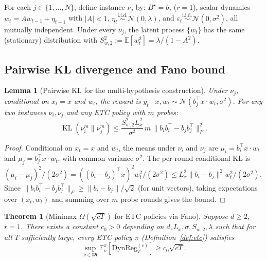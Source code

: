 \documentclass[12pt]{article}
\newcommand{\E}{\mathbb{E}}
\newcommand{\DynReg}{\mathrm{DynReg}}
\DeclareMathOperator{\KL}{KL}
\newtheorem{lemma}{Lemma}
\newtheorem{theorem}{Theorem}
\theoremstyle{plain}
\theoremstyle{definition}
\begin{document}
For each $j \in \{1, \ldots, N\}$, define instance $\nu_j$ by: $B^\star = b_j$ ($r = 1$), scalar dynamics $w_t = A w_{t-1} + \eta_{t-1}$ with $|A| < 1$, $\eta_t \stackrel{\mathrm{i.i.d.}}{\sim} \mathcal{N}(0, \lambda)$, and $\varepsilon_t \stackrel{\mathrm{i.i.d.}}{\sim} \mathcal{N}(0, \sigma^2)$, all mutually independent. Under every $\nu_j$, the latent process $\{w_t\}$ has the same (stationary) distribution with $S_{w,2}^2 := \E[w_t^2] = \lambda/(1 - A^2)$.

\subsection{Pairwise KL divergence and Fano bound}

\begin{lemma}[Pairwise KL for the multi-hypothesis construction]
\label{lem:kl_fano}
Under $\nu_j$, conditional on $x_t = x$ and $w_t$, the reward is $y_t \mid x, w_t \sim \mathcal{N}(b_j^\top x \cdot w_t, \sigma^2)$. For any two instances $\nu_i, \nu_j$ and any ETC policy with $m$ probes:
\begin{equation}
\KL(\nu_i^m \| \nu_j^m) \le \frac{S_{w,2}^2 L_x^2}{\sigma^2}\, m\, \|b_i b_i^\top - b_j b_j^\top\|_F^2.
\label{eq:kl_fano_etc}
\end{equation}
\end{lemma}

\begin{proof}
Conditional on $x_t = x$ and $w_t$, the means under $\nu_i$ and $\nu_j$ are $\mu_i = b_i^\top x \cdot w_t$ and $\mu_j = b_j^\top x \cdot w_t$, with common variance $\sigma^2$. The per-round conditional KL is $(\mu_i - \mu_j)^2/(2\sigma^2) = ((b_i - b_j)^\top x)^2 w_t^2/(2\sigma^2) \le L_x^2 \|b_i - b_j\|^2 w_t^2/(2\sigma^2)$. Since $\|b_i b_i^\top - b_j b_j^\top\|_F \ge \|b_i - b_j\|/\sqrt{2}$ (for unit vectors), taking expectations over $(x_t, w_t)$ and summing over $m$ probe rounds gives the bound.
\end{proof}

\begin{theorem}[Minimax $\Omega(\sqrt{cT})$ for ETC policies via Fano]
\label{thm:etc}
Suppose $d \ge 2$, $r = 1$. There exists a constant $c_0 > 0$ depending on $d, L_x, \sigma, S_{w,2}, \lambda$ such that for all $T$ sufficiently large, every ETC policy $\pi$ (Definition~\ref{def:etc}) satisfies
\begin{equation}
\sup_{\nu \in \mathfrak{M}} \E_\nu^\pi[\DynReg_T^{(c)}] \ge c_0\sqrt{cT}.
\label{eq:etc_lb}
\end{equation}
\end{theorem}
\end{document}
